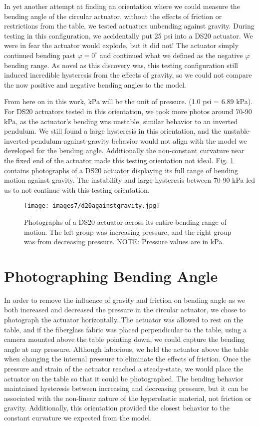 In yet another attempt at finding an orientation where we could measure the bending angle of the circular actuator, without the effects of friction or restrictions from the table, we tested actuators unbending against gravity. During testing in this configuration, we accidentally put 25 psi into a DS20 actuator. We were in fear the actuator would explode, but it did not! The actuator simply continued bending past $\varphi=0^\circ$ and continued what we defined as the negative $\varphi$ bending range. As novel as this discovery was, this testing configuration still induced incredible hysteresis from the effects of gravity, so we could not compare the now positive and negative bending angles to the model. 

From here on in this work, kPa will be the unit of pressure. (1.0 psi = 6.89 kPa). For DS20 actuators tested in this orientation, we took more photos around 70-90 kPa, as the actuator's bending was unstable, similar behavior to an inverted pendulum. We still found a large hysteresis in this orientation, and the unstable-inverted-pendulum-against-gravity behavior would not align with the model we developed for the bending angle. Additionally the non-constant curvature near the fixed end of the actuator made this testing orientation not ideal. Fig. \ref{fig:d20againstgravity} contains photographs of a DS20 actuator displaying its full range of bending motion against gravity. The instability and large hysteresis between 70-90 kPa led us to not continue with this testing orientation. 

\begin{figure}[h]
    \centering
     \texttt{[image: images7/d20againstgravity.jpg]}
    \caption{Photographs of a DS20 actuator across its entire bending range of motion. The left group was increasing pressure, and the right group was from decreasing pressure. NOTE: Pressure values are in kPa.}
    \label{fig:d20againstgravity}
\end{figure}

\clearpage
\section{Photographing Bending Angle}

In order to remove the influence of gravity and friction on bending angle as we both increased and decreased the pressure in the circular actuator, we chose to photograph the actuator horizontally. The actuator was allowed to rest on the table, and if the fiberglass fabric was placed perpendicular to the table, using a camera mounted above the table pointing down, we could capture the bending angle at any pressure. Although laborious, we held the actuator above the table when changing the internal pressure to eliminate the effects of friction. Once the pressure and strain of the actuator reached a steady-state, we would place the actuator on the table so that it could be photographed. The bending behavior maintained hysteresis between increasing and decreasing pressure, but it can be associated with the non-linear nature of the hyperelastic material, not friction or gravity. Additionally, this orientation provided the closest behavior to the constant curvature we expected from the model. 

